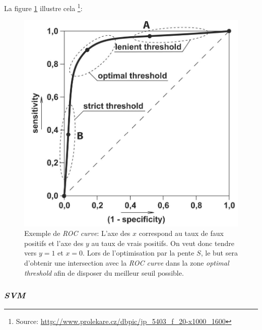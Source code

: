 \documentclass[a4paper, 11pt]{article}
\begin{document}
La figure \ref{roc_curve} illustre cela \footnote{Source: \url{http://www.prolekare.cz/dbpic/jp_5403_f_20-x1000_1600}}:
\begin{figure}[H]
\centering
\includegraphics[scale=0.20]{images/roc_curve}
\caption{Exemple de \textit{ROC curve}: L'axe des $x$ correspond au taux de faux positifs et l'axe des $y$ 
au taux de vrais positifs. On veut donc tendre vers $y = 1$ et $x = 0$. Lors de l'optimisation par la pente $S$, 
le but sera d'obtenir une intersection avec la \textit{ROC curve} dans la zone \textit{optimal threshold} 
afin de disposer du meilleur seuil possible.}
\label{roc_curve}
\end{figure}


\subsubsection{\textit{SVM}}\label{section svm}
\end{document}
